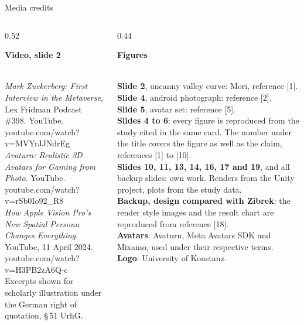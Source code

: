 \documentclass[aspectratio=169,10pt]{beamer}
\begin{document}
\begin{frame}{Media credits}
  \vspace{0.4em}
  \footnotesize
  \begin{columns}[T]
    \begin{column}{0.52\textwidth}
      \colorbox{knlight}{\parbox{0.95\textwidth}{\color{knblue}\textbf{Video, slide 2}}}\\[0.6em]
      \scriptsize
      \textit{Mark Zuckerberg: First Interview in the Metaverse}, Lex Fridman Podcast \#398. YouTube.\\
      {\color{kngrey}youtube.com/watch?v=MVYrJJNdrEg}\\[0.6em]
      \textit{Avaturn: Realistic 3D Avatars for Gaming from Photo}. YouTube.\\
      {\color{kngrey}youtube.com/watch?v=rSb0Io92\_R8}\\[0.6em]
      \textit{How Apple Vision Pro's New Spatial Persona Changes Everything}. YouTube, 11 April 2024.\\
      {\color{kngrey}youtube.com/watch?v=H3PB2zA6Q-c}\\[0.9em]
      {\scriptsize Excerpts shown for scholarly illustration under the German right of quotation, \S\,51 UrhG.}
    \end{column}
    \begin{column}{0.44\textwidth}
      \colorbox{knlight}{\parbox{0.95\textwidth}{\color{knblue}\textbf{Figures}}}\\[0.6em]
      \scriptsize
      \textbf{Slide 2}, uncanny valley curve: Mori, reference [1].\\[0.6em]
      \textbf{Slide 4}, android photograph: reference [2].\\[0.6em]
      \textbf{Slide 5}, avatar set: reference [5].\\[0.6em]
      \textbf{Slides 4 to 6}: every figure is reproduced from the study cited in the same card. The number under the title covers the figure as well as the claim, references [1] to [10].\\[0.6em]
      \textbf{Slides 10, 11, 13, 14, 16, 17 and 19}, and all backup slides: own work. Renders from the Unity project, plots from the study data.\\[0.6em]
      \textbf{Backup, design compared with Zibrek}: the render style images and the result chart are reproduced from reference [18].\\[0.6em]
      \textbf{Avatars}: Avaturn, Meta Avatars SDK and Mixamo, used under their respective terms.\\[0.6em]
      \textbf{Logo}: University of Konstanz.
    \end{column}
  \end{columns}
\end{frame}
\end{document}
